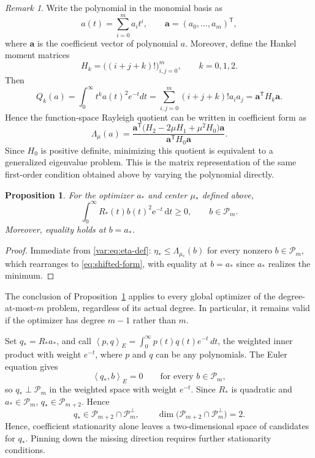 \documentclass[11pt]{article}
\numberwithin{equation}{section}
\newtheorem{proposition}[theorem]{Proposition}
\theoremstyle{definition}
\theoremstyle{remark}
\newtheorem{remark}[theorem]{Remark}
\newcommand{\Pcal}{\mathcal P}
\newcommand{\dd}{\,\mathrm d}
\newcommand{\e}{\mathrm e}
\newcommand{\ip}[2]{\left\langle #1,#2\right\rangle_{E}}
\begin{document}
\begin{remark}
Write the polynomial in the monomial basis as
$$
a(t)=\sum_{i=0}^m a_i t^i,
\qquad
\bm a=(a_0,\ldots,a_m)^\mathsf{T},
$$
where $\bm a$ is the coefficient vector of polynomial $a$. Moreover, define the Hankel moment matrices
$$
H_k=\bigl((i+j+k)!\bigr)_{i,j=0}^m,
\qquad k=0,1,2.
$$
Then
$$
Q_k(a) = \int_0^\infty t^k a(t)^2e^{-t}dt
= \sum_{i,j=0}^m (i+j+k)!a_i a_j
=\bm a^\mathsf{T}H_k\bm a.
$$
Hence the function-space Rayleigh quotient can be written in coefficient form as
$$
\Lambda_\mu(a)
=
\frac{\bm a^\mathsf{T}
\bigl(H_2-2\mu H_1+\mu^2H_0\bigr)\bm a}
{\bm a^\mathsf{T}H_0\bm a}.
$$
Since $H_0$ is positive definite, minimizing this quotient is equivalent to a generalized eigenvalue problem. This is the matrix representation of the same first-order condition obtained above by varying the polynomial directly.
\end{remark}


\begin{proposition}\label{prop:shifted-form}
For the optimizer $a_*$ and center $\mu_*$ defined above,
\begin{equation}\label{eq:shifted-form}
  \int_0^\infty R_*(t)b(t)^2\e^{-t}\dd t\ge0,
  \qquad b\in\Pcal_m.
\end{equation}
Moreover, equality holds at $b=a_*$.
\end{proposition}
\begin{proof}
Immediate from \eqref{var:eq:eta-def}: $\eta_*\le\Lambda_{\mu_*}(b)$ for every nonzero $b\in\Pcal_m$, which rearranges to \eqref{eq:shifted-form}, with equality at $b=a_*$ since $a_*$ realizes the minimum.
\end{proof}
The conclusion of Proposition~\ref{prop:shifted-form} applies to every global optimizer of the  degree-at-most-$m$ problem, regardless of its actual degree. In particular, it remains valid if the optimizer has degree $m-1$ rather than $m$.



Set $q_* = R_* a_*$, and call $\ip{p}{q}=\int_0^\infty p(t)q(t)e^{-t}\,dt$, the weighted inner product with weight \(e^{-t}\), where $p$ and $q$ can be any polynomials.
The Euler equation gives
$$
\ip{q_*}{b} =0
\qquad
\text{for every } b\in\Pcal_m,
$$
so \(q_*\perp\Pcal_m\) in the weighted space with weight \(e^{-t}\). Since \(R_*\) is quadratic and \(a_*\in\Pcal_m\), $q_*\in\Pcal_{m+2}$.
Hence
\begin{equation}
\label{eq:q_space}
q_*\in\Pcal_{m+2}\cap\Pcal_m^\perp,
\qquad
\dim\bigl(\Pcal_{m+2}\cap\Pcal_m^\perp\bigr)=2.
\end{equation}
Hence, coefficient stationarity alone leaves a two-dimensional space of candidates for \(q_*\). Pinning down the missing direction requires further stationarity conditions.
\end{document}
